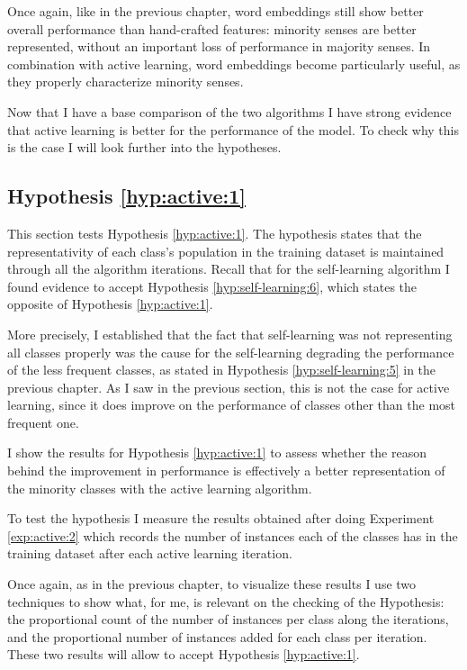 Once again, like in the previous chapter, word embeddings still show better
overall performance than hand-crafted features: minority senses are better
represented, without an important loss of performance in majority senses. In
combination with active learning, word embeddings become particularly useful,
as they properly characterize minority senses. 

Now that I have a base comparison of the two algorithms I have strong evidence
that active learning is better for the performance of the model. To check why
this is the case I will look further into the hypotheses.

\subsection{Hypothesis \ref{hyp:active:1}}\label{sec:active:hyp:1}

This section tests Hypothesis \ref{hyp:active:1}. The hypothesis states that
the representativity of each class's population in the training dataset is
maintained through all the algorithm iterations. Recall that for the
self-learning algorithm I found evidence to accept Hypothesis
\ref{hyp:self-learning:6}, which states the opposite of Hypothesis
\ref{hyp:active:1}. 

More precisely, I established that the fact that self-learning was not
representing all classes properly was the cause for the self-learning degrading
the performance of the less frequent classes, as stated in Hypothesis
\ref{hyp:self-learning:5} in the previous chapter. As I saw in the previous
section, this is not the case for active learning, since it does improve on the
performance of classes other than the most frequent one.

I show the results for Hypothesis \ref{hyp:active:1} to assess whether the
reason behind the improvement in performance is effectively a better
representation of the minority classes with the active learning algorithm.

To test the hypothesis I measure the results obtained after doing Experiment
\ref{exp:active:2} which records the number of instances each of the classes
has in the training dataset after each active learning iteration.

Once again, as in the previous chapter, to visualize these results I use two
techniques to show what, for me, is relevant on the checking of the Hypothesis:
the proportional count of the number of instances per class along the
iterations, and the proportional number of instances added for each class per
iteration. These two results will allow to accept Hypothesis
\ref{hyp:active:1}.

